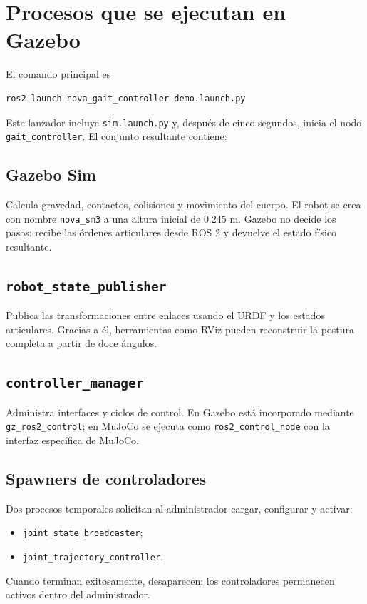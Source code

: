 \documentclass[11pt,a4paper]{article}
\begin{document}
\section{Procesos que se ejecutan en Gazebo}
El comando principal es
\begin{lstlisting}[style=terminal]
ros2 launch nova_gait_controller demo.launch.py
\end{lstlisting}
Este lanzador incluye \texttt{sim.launch.py} y, después de cinco segundos,
inicia el nodo \texttt{gait\_controller}. El conjunto resultante contiene:

\subsection{Gazebo Sim}
Calcula gravedad, contactos, colisiones y movimiento del cuerpo. El robot se
crea con nombre \texttt{nova\_sm3} a una altura inicial de $0.245$ m. Gazebo
no decide los pasos: recibe las órdenes articulares desde ROS 2 y devuelve el
estado físico resultante.

\subsection{\texttt{robot\_state\_publisher}}
Publica las transformaciones entre enlaces usando el URDF y los estados
articulares. Gracias a él, herramientas como RViz pueden reconstruir la postura
completa a partir de doce ángulos.

\subsection{\texttt{controller\_manager}}
Administra interfaces y ciclos de control. En Gazebo está incorporado mediante
\texttt{gz\_ros2\_control}; en MuJoCo se ejecuta como
\texttt{ros2\_control\_node} con la interfaz específica de MuJoCo.

\subsection{Spawners de controladores}
Dos procesos temporales solicitan al administrador cargar, configurar y activar:
\begin{itemize}
\item \texttt{joint\_state\_broadcaster};
\item \texttt{joint\_trajectory\_controller}.
\end{itemize}
Cuando terminan exitosamente, desaparecen; los controladores permanecen activos
dentro del administrador.
\end{document}
